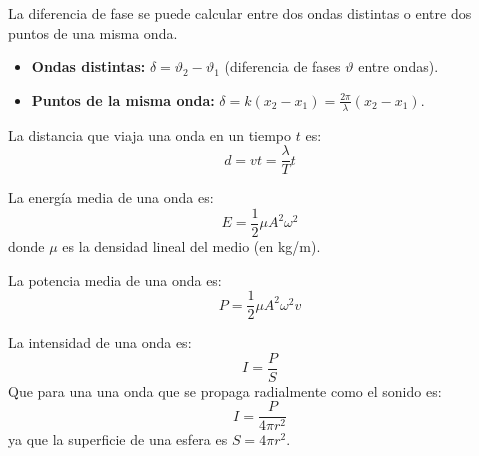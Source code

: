 \begin{tcolorbox}[title=Diferencia de fase y distancia recorrida]
  La diferencia de fase se puede calcular entre dos ondas distintas o entre dos puntos de una misma onda.
  \begin{itemize}
    \item \textbf{Ondas distintas:} \(\delta = \vartheta_2 - \vartheta_1\) (diferencia de fases \(\vartheta\) entre ondas).
    \item \textbf{Puntos de la misma onda:} \(\delta = k(x_2 - x_1) = \frac{2\pi}{\lambda} (x_2 - x_1)\).
  \end{itemize}

  La distancia que viaja una onda en un tiempo \(t\) es:
  \[
    d = v t = \frac{\lambda}{T} t
  \]
\end{tcolorbox}

\begin{tcolorbox}[title=Energía y potencia de una onda]
  La energía media de una onda es:
  \[
    E = \frac{1}{2} \mu A^2 \omega^2
  \]
  donde \(\mu\) es la densidad lineal del medio (en kg/m).

  La potencia media de una onda es:
  \[
    P = \frac{1}{2} \mu A^2 \omega^2 v
  \]
\end{tcolorbox}

\begin{tcolorbox}[title=Intensidad de una onda]
  La intensidad de una onda es:
  \[
    I = \frac{P}{S}
  \]
  Que para una una onda que se propaga radialmente como el sonido es:
  \[
    I = \frac{P}{4\pi r^2}
  \]
  ya que la superficie de una esfera es \(S=4\pi r^2\).
\end{tcolorbox}